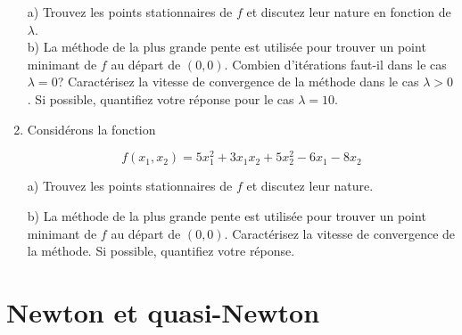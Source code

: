 \begin{enumerate}
    a) Trouvez les points stationnaires de $f$ et discutez leur nature en fonction de $\lambda$.\\

    b) La méthode de la plus grande pente est utilisée pour trouver un point minimant de $f$ au départ de $(0, 0)$.
    Combien d'itérations faut-il dans le cas $\lambda = 0$? Caractérisez la vitesse de convergence de la
    méthode dans le cas $\lambda >0$. Si possible, quantifiez votre réponse pour le cas  $\lambda =10$.

    \begin{solution}
    \end{solution}

  \item  Consid\'erons la fonction

    $$f(x_1,x_2) = 5 x_1^2 + 3 x_1 x_2 + 5 x_2^2 - 6 x_1 -8 x_2$$




    a) Trouvez les points stationnaires de $f$ et discutez leur nature.

    b) La m\'ethode de la plus grande pente est utilis\'ee pour trouver un point
    minimant de $f$ au d\'epart de $(0, 0)$.
    Caract\'erisez la vitesse de convergence de la
    m\'ethode. Si possible, quantifiez votre r\'eponse.



\end{enumerate}

\newpage


\section{Newton et quasi-Newton}

